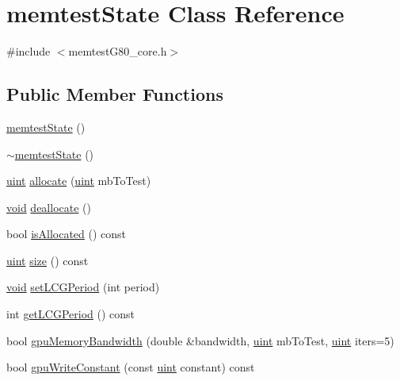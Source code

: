\hypertarget{classmemtestState}{\section{memtest\-State \-Class \-Reference}
\label{classmemtestState}
}


{\ttfamily \#include $<$memtest\-G80\-\_\-core.\-h$>$}

\subsection*{\-Public \-Member \-Functions}
\begin{DoxyCompactItemize}
\item 
\hyperlink{classmemtestState_ac687b7e91f0e2cbb3adc8d095100e743}{memtest\-State} ()
\item 
\hyperlink{classmemtestState_a8c9ba4225f7a3f177b42c712b9fd57e3}{$\sim$memtest\-State} ()
\item 
\hyperlink{memtestG80__core_8h_a91ad9478d81a7aaf2593e8d9c3d06a14}{uint} \hyperlink{classmemtestState_a3ba3156d9b0bed2c4e0ebf36def92277}{allocate} (\hyperlink{memtestG80__core_8h_a91ad9478d81a7aaf2593e8d9c3d06a14}{uint} mb\-To\-Test)
\item 
\hyperlink{nbnxn__kernel__simd__4xn__outer_8h_a8dc3f4a797ed992dff49d2fa3477eee8}{void} \hyperlink{classmemtestState_ad1d72e33e9d26a64213207c8eba8e77f}{deallocate} ()
\item 
bool \hyperlink{classmemtestState_a65a2471234d27ed32a4f7078f419444d}{is\-Allocated} () const 
\item 
\hyperlink{memtestG80__core_8h_a91ad9478d81a7aaf2593e8d9c3d06a14}{uint} \hyperlink{classmemtestState_a2723a0266149638900fd1574f7f288b1}{size} () const 
\item 
\hyperlink{nbnxn__kernel__simd__4xn__outer_8h_a8dc3f4a797ed992dff49d2fa3477eee8}{void} \hyperlink{classmemtestState_ae466edce59c53993e07707bd9d425b5f}{set\-L\-C\-G\-Period} (int period)
\item 
int \hyperlink{classmemtestState_a75ca6fb2c23342e1586e62cd4b31379f}{get\-L\-C\-G\-Period} () const 
\item 
bool \hyperlink{classmemtestState_ad2d4cd1e4ec6acc97e7a6325e0636015}{gpu\-Memory\-Bandwidth} (double \&bandwidth, \hyperlink{memtestG80__core_8h_a91ad9478d81a7aaf2593e8d9c3d06a14}{uint} mb\-To\-Test, \hyperlink{memtestG80__core_8h_a91ad9478d81a7aaf2593e8d9c3d06a14}{uint} iters=5)
\item 
bool \hyperlink{classmemtestState_a97f452e84760b44060d46bbc37c6f928}{gpu\-Write\-Constant} (const \hyperlink{memtestG80__core_8h_a91ad9478d81a7aaf2593e8d9c3d06a14}{uint} constant) const 

\end{DoxyCompactItemize}
